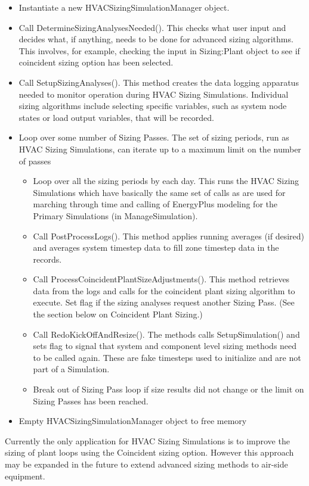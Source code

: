 \begin{itemize}
\item
  Instantiate a new HVACSizingSimulationManager object.
\item
  Call DetermineSizingAnalysesNeeded(). This checks what user input and decides what, if anything, needs to be done for advanced sizing algorithms. This involves, for example, checking the input in Sizing:Plant object to see if coincident sizing option has been selected.
\item
  Call SetupSizingAnalyses(). This method creates the data logging apparatus needed to monitor operation during HVAC Sizing Simulations. Individual sizing algorithms include selecting specific variables, such as system node states or load output variables, that will be recorded.
\item
  Loop over some number of Sizing Passes. The set of sizing periods, run as HVAC Sizing Simulations, can iterate up to a maximum limit on the number of passes
  \begin{itemize}
  \item
    Loop over all the sizing periods by each day. This runs the HVAC Sizing Simulations which have basically the same set of calls as are used for marching through time and calling of EnergyPlus modeling for the Primary Simulations (in ManageSimulation).
  \item
    Call PostProcessLogs(). This method applies running averages (if desired) and averages system timestep data to fill zone timestep data in the records.
  \item
    Call ProcessCoincidentPlantSizeAdjustments(). This method retrieves data from the logs and calls for the coincident plant sizing algorithm to execute. Set flag if the sizing analyses request another Sizing Pass. (See the section below on Coincident Plant Sizing.)
  \item
    Call RedoKickOffAndResize(). The methods calls SetupSimulation() and sets flag to signal that system and component level sizing methods need to be called again. These are fake timesteps used to initialize and are not part of a Simulation.
  \item
    Break out of Sizing Pass loop if size results did not change or the limit on Sizing Passes has been reached.
  \end{itemize}
\item
  Empty HVACSizingSimulationManager object to free memory
\end{itemize}

Currently the only application for HVAC Sizing Simulations is to improve the sizing of plant loops using the Coincident sizing option. However this approach may be expanded in the future to extend advanced sizing methods to air-side equipment.
